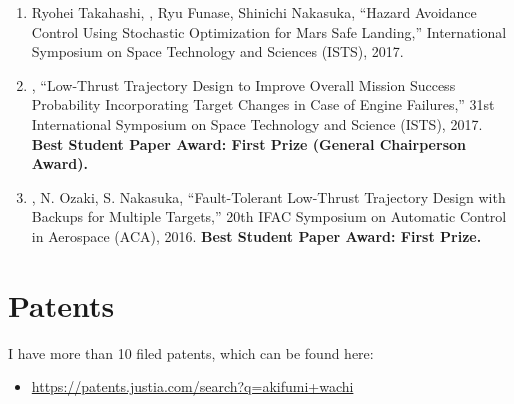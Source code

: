 \begin{enumerate}[leftmargin=*,itemsep=0.35em]
\item
Ryohei Takahashi, \aw, Ryu Funase, Shinichi Nakasuka,
``Hazard Avoidance Control Using Stochastic Optimization for Mars Safe Landing,''
International Symposium on Space Technology and Sciences (ISTS), 2017.

\item
\aw,
``Low-Thrust Trajectory Design to Improve Overall Mission Success Probability Incorporating Target Changes in Case of Engine Failures,''
31st International Symposium on Space Technology and Science (ISTS), 2017. \textbf{Best Student Paper Award: First Prize (General Chairperson Award).}
\item
\aw, N. Ozaki, S. Nakasuka,
``Fault-Tolerant Low-Thrust Trajectory Design with Backups for Multiple Targets,''
20th IFAC Symposium on Automatic Control in Aerospace (ACA), 2016. \textbf{Best Student Paper Award: First Prize.}
\end{enumerate}


\section{Patents}

I have more than 10 filed patents, which can be found here:
\begin{itemize}
    \item \url{https://patents.justia.com/search?q=akifumi+wachi}
\end{itemize}
